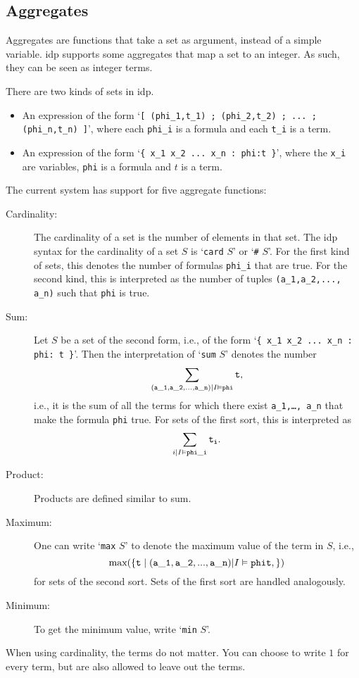 \documentclass[a4]{article}
\newcommand{\idp}{{\sc idp}\xspace}
\newcommand{\code}[1]{{\tt #1}}
\begin{document}
\subsection{Aggregates}
Aggregates are functions that take a set as argument, instead of a simple variable. \idp supports some aggregates that map a set to an integer. As such, they can be seen as integer terms.

There are two kinds of sets in \idp. 
\begin{itemize}
	\item An expression of the form `{\tt [ (phi\_1,t\_1) ; (phi\_2,t\_2) ; ... ; (phi\_n,t\_n) ]}', where each {\tt phi\_i} is a formula and each \code{t\_i} is a term.  %
	\item An expression of the form `{\tt \{ x\_1 x\_2 ... x\_n : phi:t \}}', where the {\tt x\_i} are variables, {\tt phi} is a formula and $t$ is a term.  %
\end{itemize} 
The current system has support for five aggregate functions:
\begin{description}
	\item[Cardinality:] The cardinality of a set is the number of elements in that set. The \idp syntax for the cardinality of a set $S$ is `{\tt card} $S$' or `{\tt \#} $S$'. For the first kind of sets, this denotes the number of formulas {\tt phi\_i} that are true.  For the second kind, this is interpreted as the number of tuples {\tt(a\_1,a\_2,..., a\_n)} such that {\tt phi} is true.
	\item[Sum:] Let $S$ be a set of the second form, i.e., of the form `{\tt \{ x\_1 x\_2 ... x\_n : phi: t \}}'. Then the interpretation of `{\tt sum} $S$' denotes the number
	\[ \sum_{{\tt(a\_1,a\_2,..., a\_n)} | I\vDash {\tt phi}} {\tt t }, \]
	i.e., it is the sum of all the terms for which there exist {\tt a\_1,\ldots, a\_n} that make the formula {\tt phi} true. For sets of the first sort, this is interpreted as 
\[ \sum_{i | I\vDash {\tt phi\_i}} {\tt t_i }. \]
	\item[Product:] Products are defined similar to sum.  
	\item[Maximum:] One can write `{\tt max} $S$' to denote the maximum value of the term in $S$, i.e.,
	\[ \textrm{max}(\{ {\tt t} \mid {\tt(a\_1,a\_2,..., a\_n)} | I\vDash {\tt phi} {\tt t },\}) \] for sets of the second sort.  Sets of the first sort are handled analogously. %
	\item[Minimum:] To get the minimum value, write `{\tt min} $S$'.
\end{description}
When using cardinality, the terms do not matter.  You can choose to write $1$ for every term, but are also allowed to leave out the terms.
\end{document}
